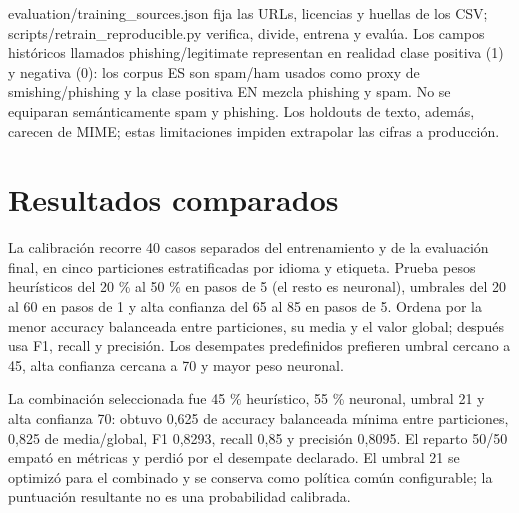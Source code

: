 \documentclass[11pt,a4paper,oneside]{report}
\begin{document}
evaluation/training\_sources.json fija las URLs, licencias y huellas de los CSV; scripts/retrain\_reproducible.py verifica, divide, entrena y evalúa. Los campos históricos llamados phishing/legitimate representan en realidad clase positiva (1) y negativa (0): los corpus ES son spam/ham usados como proxy de smishing/phishing y la clase positiva EN mezcla phishing y spam. No se equiparan semánticamente spam y phishing. Los holdouts de texto, además, carecen de MIME; estas limitaciones impiden extrapolar las cifras a producción.

\section{Resultados comparados}

La calibración recorre 40 casos separados del entrenamiento y de la evaluación final, en cinco particiones estratificadas por idioma y etiqueta. Prueba pesos heurísticos del 20 \% al 50 \% en pasos de 5 (el resto es neuronal), umbrales del 20 al 60 en pasos de 1 y alta confianza del 65 al 85 en pasos de 5. Ordena por la menor accuracy balanceada entre particiones, su media y el valor global; después usa F1, recall y precisión. Los desempates predefinidos prefieren umbral cercano a 45, alta confianza cercana a 70 y mayor peso neuronal.

La combinación seleccionada fue 45 \% heurístico, 55 \% neuronal, umbral 21 y alta confianza 70: obtuvo 0,625 de accuracy balanceada mínima entre particiones, 0,825 de media/global, F1 0,8293, recall 0,85 y precisión 0,8095. El reparto 50/50 empató en métricas y perdió por el desempate declarado. El umbral 21 se optimizó para el combinado y se conserva como política común configurable; la puntuación resultante no es una probabilidad calibrada.
\end{document}
